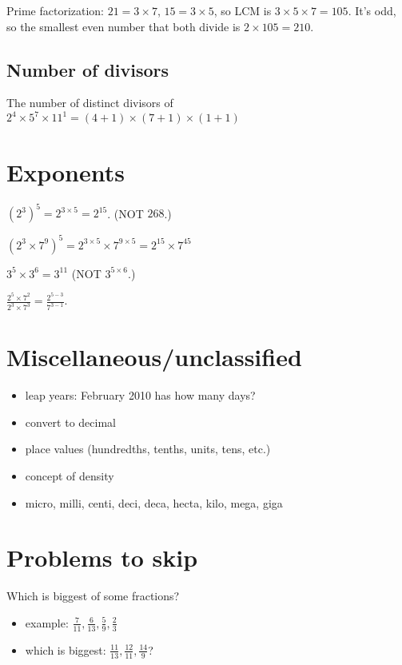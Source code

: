 \documentclass[fullpage,twocolumn]{article}
\begin{document}
Prime factorization: $21 = 3 \times 7$, $15 = 3 \times 5$, so LCM is 
$3 \times 5 \times 7 = 105$. It's odd, so the smallest even number
that both divide is $2 \times 105 = 210$.

\subsection{Number of divisors}

The number of distinct divisors of $2^4\times 5^7 \times 11^1 = (4+1)\times(7+1)\times(1+1)$

\section{Exponents}

$(2^3)^5 = 2^{3 \times 5} = 2^{15}$. (NOT $26{8}$.)

$(2^3 \times 7^9)^5 = 2^{3 \times 5}  \times 7^{9 \times 5}= 2^{15} \times 7^{45}$

$3^5 \times 3^6 = 3^{11}$ (NOT $3^{5 \times 6}$.)

$\frac{2^5 \times 7^2}{2^3 \times 7^3} = \frac{2^{5-3}}{7^{3-1}}$.

\section{Miscellaneous/unclassified}
\begin{itemize}
\item leap years: February  2010 has how many days?
\item convert to decimal
\item place values (hundredths, tenths, units, tens, etc.)
\item concept of density
\item micro, milli, centi, deci, deca, hecta, kilo, mega, giga
\end{itemize} 



\section{Problems to skip}
Which is biggest of some fractions? 
\begin{itemize}
\item example: $\frac{7}{11}, \frac{6}{13}, \frac{5}{9}, \frac{2}{3}$
\item which is biggest: $\frac{11}{13}, \frac{12}{11}, \frac{14}{9}$?
\end{itemize} 

\end{document}
